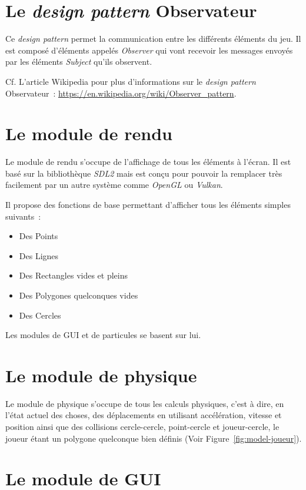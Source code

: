 \documentclass[10pt, french, a4paper]{report}
\begin{document}
\section{Le \textit{design pattern} Observateur}

Ce \textit{design pattern} permet la communication entre les différents éléments du
jeu. Il est composé d'éléments appelés \textit{Observer} qui vont \og recevoir \fg{} 
les messages envoyés par les éléments \textit{Subject} qu'ils observent.

Cf. L'article Wikipedia pour plus d'informations sur le \textit{design pattern}
Observateur~: \url{https://en.wikipedia.org/wiki/Observer_pattern}.

\section{Le module de rendu}

Le module de rendu s'occupe de l'affichage de tous les éléments à l'écran. Il est basé
sur la bibliothèque \textit{SDL2} mais est conçu pour pouvoir la remplacer très 
facilement par un autre système comme \textit{OpenGL} ou \textit{Vulkan}.

Il propose des fonctions de base permettant d'afficher tous les éléments simples 
suivants~:
\begin{itemize}
	\item Des Points
	\item Des Lignes
	\item Des Rectangles vides et pleins
	\item Des Polygones quelconques vides
	\item Des Cercles
\end{itemize}

Les modules de GUI et de particules se basent sur lui.

\section{Le module de physique}

Le module de physique s'occupe de tous les calculs physiques, c'est à dire, en l'état
actuel des choses, des déplacements en utilisant accélération, vitesse et position 
ainsi que des collisions cercle-cercle, point-cercle et joueur-cercle, le joueur
étant un polygone quelconque bien définis (Voir Figure~\ref{fig:model-joueur}).


\section{Le module de GUI}
\end{document}
